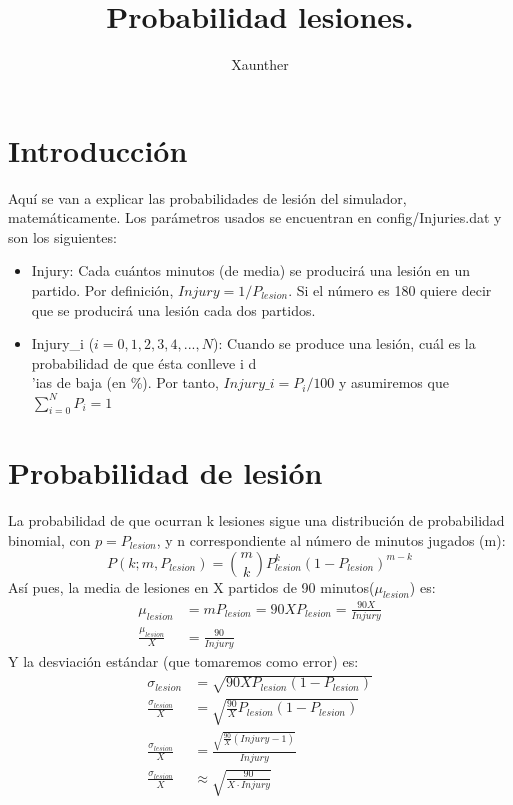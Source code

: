 \documentclass[a4paper,9pt]{article}
\title{Probabilidad lesiones.}
\author{Xaunther}
\begin{document}
\maketitle

\section{Introducci\'on}
Aqu\'i se van a explicar las probabilidades de lesi\'on del simulador, matem\'aticamente. Los par\'ametros usados se encuentran en config/Injuries.dat y son los siguientes:
\begin{itemize}
\item Injury: Cada cu\'antos minutos (de media) se producir\'a una lesi\'on en un partido. Por definici\'on, $Injury=1/P_{lesion}$. Si el n\'umero es 180 quiere decir que se producir\'a una lesi\'on cada dos partidos.
\item Injury\_i ($i=0,1,2,3,4,...,N$): Cuando se produce una lesi\'on, cu\'al es la probabilidad de que \'esta conlleve i d\\'ias de baja (en \%). Por tanto, $Injury\_i=P_i/100$ y asumiremos que $\sum_{i=0}^{N}{P_i}=1$
\end{itemize}

\section{Probabilidad de lesi\'on}
La probabilidad de que ocurran k lesiones sigue una distribuci\'on de probabilidad binomial, con $p=P_{lesion}$, y n correspondiente al n\'umero de minutos jugados (m):
\begin{equation}
P(k;m,P_{lesion}) = \binom{m}{k}P_{lesion}^k\left(1-P_{lesion}\right)^{m-k}
\end{equation}
As\'i pues, la media de lesiones en X partidos de 90 minutos($\mu_{lesion}$) es:
\begin{align}
\mu_{lesion}&=mP_{lesion}=90XP_{lesion}=\frac{90X}{Injury}\\
\frac{\mu_{lesion}}{X}&=\frac{90}{Injury}
\end{align}
Y la desviaci\'on est\'andar (que tomaremos como error) es:
\begin{align}
\sigma_{lesion}&=\sqrt{90XP_{lesion}(1-P_{lesion})}\\
\frac{\sigma_{lesion}}{X}&=\sqrt{\frac{90}{X}P_{lesion}(1-P_{lesion})}\\
\frac{\sigma_{lesion}}{X}&=\frac{\sqrt{\frac{90}{X}(Injury-1)}}{Injury}\\
\frac{\sigma_{lesion}}{X}&\approx\sqrt{\frac{90}{X\cdot Injury}}
\end{align}
\end{document}
